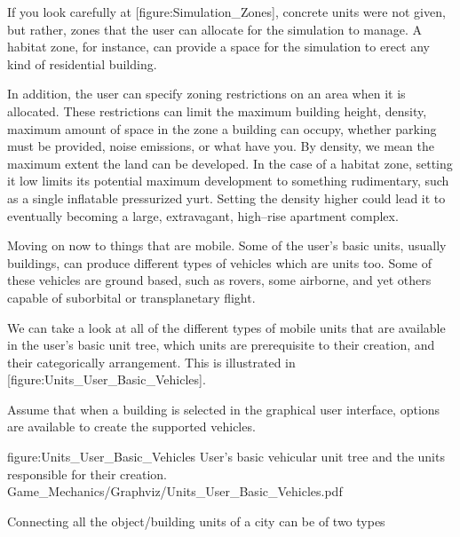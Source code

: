     {}

\page
{}
    {}

If you look carefully at [figure:Simulation_Zones], concrete units were not given, but rather, zones that the user can allocate for the simulation to manage. A habitat zone, for instance, can provide a space for the simulation to erect any kind of residential building. 

In addition, the user can specify zoning restrictions on an area when it is allocated. These restrictions can limit the maximum building height, density, maximum amount of space in the zone a building can occupy, whether parking must be provided, noise emissions, or what have you. By density, we mean the maximum extent the land can be developed. In the case of a habitat zone, setting it low limits its potential maximum development to something rudimentary, such as a single inflatable pressurized yurt. Setting the density higher could lead it to eventually becoming a large, extravagant, high--rise apartment complex.

Moving on now to things that are mobile. Some of the user's basic units, usually buildings, can produce different types of vehicles which are units too. Some of these vehicles are ground based, such as rovers, some airborne, and yet others capable of suborbital or transplanetary flight.

We can take a look at all of the different types of mobile units that are available in the user's basic unit tree, which units are prerequisite to their creation, and their categorically arrangement. This is illustrated in [figure:Units_User_Basic_Vehicles]. 

Assume that when a building is selected in the graphical user interface, options are available to create the supported vehicles.

\FullPageDiagram
    {figure:Units_User_Basic_Vehicles}
    {User's basic vehicular unit tree and the units responsible for their creation.}
    {Game_Mechanics/Graphviz/Units_User_Basic_Vehicles.pdf}


Connecting all the object/building units of a city can be of two types

